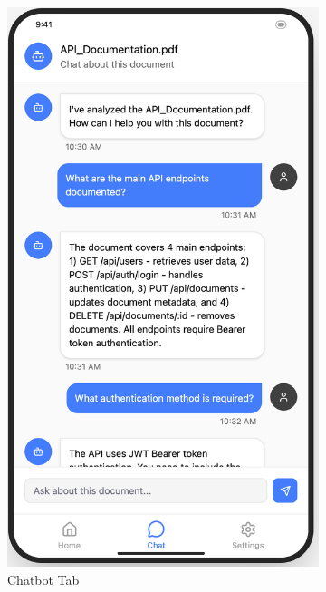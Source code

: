 \documentclass[10pt]{article}
\begin{document}
\begin{figure}
\begin{subfigure}{0.3\textwidth}
                \includegraphics[width=\textwidth]{img/FrontendChatTab.png}
                \caption{Chatbot Tab}
                \label{fig:ChatbotTab}
            \end{subfigure}
            \hfill
            \begin{subfigure}{0.3\textwidth}

\end{subfigure}
\end{figure}
\end{document}

